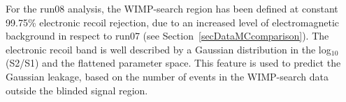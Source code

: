 For the run08 analysis, the WIMP-search region has been defined at constant 99.75\% electronic recoil rejection, due to an increased level of electromagnetic background in respect to run07 (see Section~\ref{secDataMCcomparison}). 
The electronic recoil band is well described by a Gaussian distribution in the log$_{10}$(S2/S1) and the flattened parameter space. This feature is used to predict the Gaussian leakage, based on the number of events in the WIMP-search data outside the blinded signal region.






